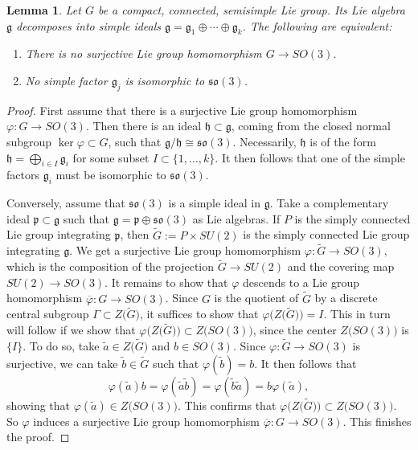 \documentclass[11pt, letterpaper, oneside,reqno]{amsart}
\theoremstyle{plain}
\newtheorem{lemma}[thm]{Lemma}
\theoremstyle{underline}
\theoremstyle{definition}
\theoremstyle{remark}
\begin{document}
	\begin{lemma}\label{lem:rephrase}
		Let $G$ be a compact, connected, semisimple Lie group. Its Lie algebra $\mathfrak{g}$ decomposes into simple ideals $\mathfrak{g}=\mathfrak{g}_1\oplus\cdots\oplus\mathfrak{g}_k$. The following are equivalent:
		\begin{enumerate}
			\item There is no surjective Lie group homomorphism $G\rightarrow SO(3)$.
			\item No simple factor $\mathfrak{g}_{j}$ is isomorphic to $\mathfrak{so}(3)$.
		\end{enumerate}
	\end{lemma}
	\begin{proof}
		First assume that there is a surjective Lie group homomorphism $\varphi:G\rightarrow SO(3)$. Then there is an ideal $\mathfrak{h}\subset\mathfrak{g}$, coming from the closed normal subgroup $\ker\varphi\subset G$, such that $\mathfrak{g}/\mathfrak{h}\cong\mathfrak{so}(3)$. Necessarily, $\mathfrak{h}$ is of the form $\mathfrak{h}=\bigoplus_{i\in I}\mathfrak{g}_{i}$ for some subset $I\subset\{1,\ldots,k\}$. It then follows that one of the simple factors $\mathfrak{g}_i$ must be isomorphic to $\mathfrak{so}(3)$.
		
		Conversely, assume that $\mathfrak{so}(3)$ is a simple ideal in $\mathfrak{g}$. Take a complementary ideal $\mathfrak{p}\subset\mathfrak{g}$ such that $\mathfrak{g}=\mathfrak{p}\oplus\mathfrak{so}(3)$ as Lie algebras. If $P$ is the simply connected Lie group integrating $\mathfrak{p}$, then $\widetilde{G}:=P\times SU(2)$ is the simply connected Lie group integrating $\mathfrak{g}$. We get a surjective Lie group homomorphism
		$
		\varphi:\widetilde{G}\rightarrow SO(3),
		$
		which is the composition of the projection $\widetilde{G}\rightarrow SU(2)$ and the covering map $SU(2)\rightarrow SO(3)$. It remains to show that $\varphi$ descends to a Lie group homomorphism $\overline{\varphi}:G\rightarrow SO(3)$. Since $G$ is the quotient of $\widetilde{G}$ by a discrete central subgroup $\Gamma\subset Z\big(\widetilde{G}\big)$, it suffices to show that $\varphi\big(Z\big(\widetilde{G}\big)\big)=I$. This in turn will follow if we show that $\varphi\big(Z\big(\widetilde{G}\big)\big)\subset Z\big(SO(3)\big)$, since the center $Z\big(SO(3)\big)$ is $\{I\}$. To do so, take $\widetilde{a}\in Z\big(\widetilde{G}\big)$ and $b\in SO(3)$. Since $\varphi:\widetilde{G}\rightarrow SO(3)$ is surjective, we can take $\widetilde{b}\in\widetilde{G}$ such that $\varphi(\widetilde{b})=b$. It then follows that
		\[
		\varphi(\widetilde{a})b=\varphi(\widetilde{a}\widetilde{b})=\varphi(\widetilde{b}\widetilde{a})=b\varphi(\widetilde{a}),
		\]
		showing that $\varphi(\widetilde{a})\in Z\big(SO(3)\big)$. This confirms that $\varphi\big(Z\big(\widetilde{G}\big)\big)\subset Z\big(SO(3)\big)$. So $\varphi$ induces a surjective Lie group homomorphism $\overline{\varphi}:G\rightarrow SO(3)$. This finishes the proof.
	\end{proof}
	
\end{document}
